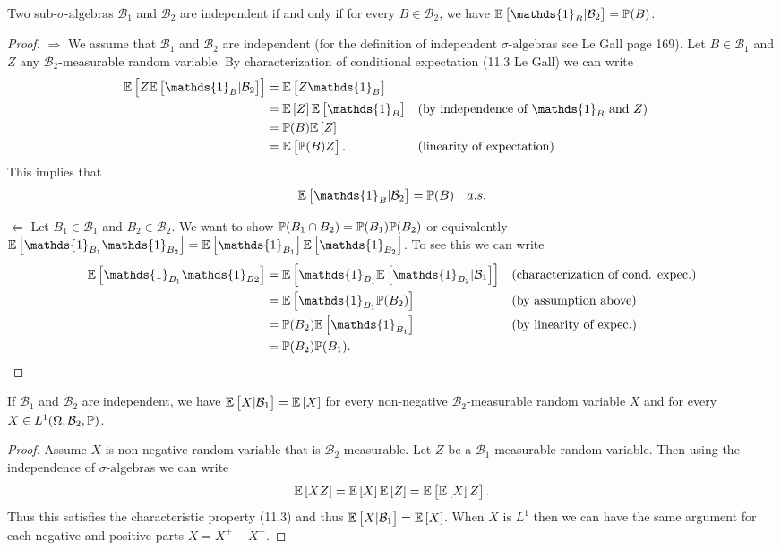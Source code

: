\begin{proposition}
	Two sub-$\sigma\text{-algebra}$s $ \mathcal{B}_1 $ and $ \mathcal{B}_2 $ are independent if and only if for every $ B \in \mathcal{B}_2 $, we have $ \E{\mathds{1}_B|\mathcal{B}_2} = \prob(B) $.
\end{proposition}
\begin{proof}
	$ \boxed{\Rightarrow} $ We assume that $ \mathcal{B}_1 $ and $ \mathcal{B}_2 $ are independent (for the definition of independent $\sigma\text{-algebra}$s see Le Gall page 169). Let $ B \in \mathcal{B}_1 $ and $ Z $ any $ \mathcal{B}_2 $-measurable random variable. By characterization of conditional expectation  (11.3 Le Gall) we can write
	\begin{align*}
		\E{Z\E{\mathds{1}_B|\mathcal{B}_2}} &= \E{Z\mathds{1}_B} \\
		&= \E{Z}\E{\mathds{1}_B} && \text{(by independence of $ \mathds{1}_B $ and $ Z $)} \\
		&= \prob(B) \E{Z} \\
		&= \E{\prob(B)Z}. && \text{(linearity of expectation)}
	\end{align*}
	This implies that 
	\[ \E{\mathds{1}_B|\mathcal{B}_2} = \prob(B) \quad a.s. \]
	
	\noindent $ \boxed{\Leftarrow} $ Let $ B_1 \in \mathcal{B}_1 $ and $ B_2 \in \mathcal{B}_2 $. We want to show $ \mathbb{P}(B_1\cap B_2) = \mathbb{P}(B_1) \mathbb{P}(B_2) $ or equivalently $ \E{\mathds{1}_{B_1} \mathds{1}_{B_2}} = \E{\mathds{1}_{B_1}} \E{\mathds{1}_{B_2}} $. To see this we can write
	\begin{align*}
		\E{\mathds{1}_{B_1} \mathds{1}_{B2}} &= \E{\mathds{1}_{B_1} \E{\mathds{1}_{B_2}|\mathcal{B}_1}}  && \text{(characterization of cond. expec.)} \\
		&=\E{\mathds{1}_{B_1} \prob(B_2)} && \text{(by assumption above)} \\
		&=\prob(B_2) \E{\mathds{1}_{B_1}} && \text{(by linearity of expec.)} \\
		&= \prob(B_2) \prob(B_1).
	\end{align*}
\end{proof}


\begin{proposition}
	If $ \mathcal{B}_1 $ and $ \mathcal{B}_2 $ are independent, we have $ \mathbb{E}\left[X|\mathcal{B}_1\right] = \mathbb{E}\left[X\right] $ for every non-negative $ \mathcal{B}_2 $-measurable random variable $ X $ and for every $ X \in L^1(\Omega,\mathcal{B}_2,\mathbb{P}) $.
\end{proposition}
\begin{proof}
	Assume $ X $ is non-negative random variable that is $ \mathcal{B}_2 $-measurable. Let $ Z $ be a $ \mathcal{B}_1 $-measurable random variable. Then using the independence of $\sigma\text{-algebra}$s we can write
	\[ \mathbb{E}\left[XZ\right] = \mathbb{E}\left[X\right]\mathbb{E}\left[Z\right] = \mathbb{E}\left[\mathbb{E}\left[X\right] Z\right]. \]
	Thus this satisfies the characteristic property (11.3) and thus $ \mathbb{E}\left[X|\mathcal{B}_1\right] = \mathbb{E}\left[X\right] $. When $ X $ is $ L^1 $ then we can have the same argument for each negative and positive parts $ X = X^+ - X^- $.
\end{proof}



